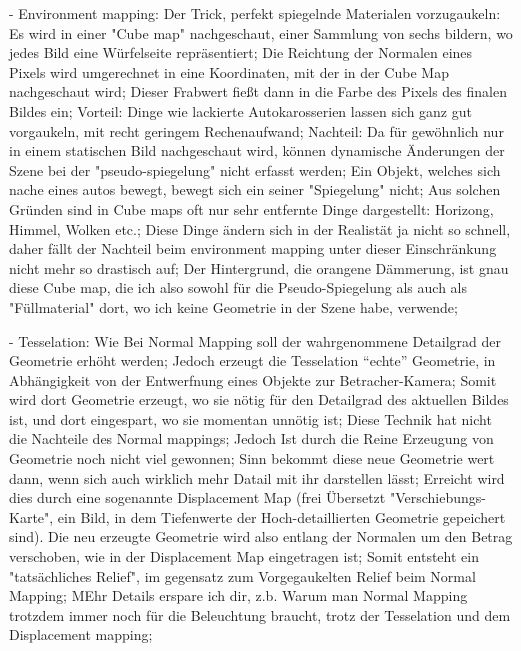 - Environment mapping: Der Trick, perfekt spiegelnde Materialen vorzugaukeln: Es wird in einer "Cube map" nachgeschaut, einer Sammlung von sechs bildern, wo jedes Bild eine Würfelseite repräsentiert; Die Reichtung der Normalen eines Pixels wird umgerechnet in eine Koordinaten, mit der in der Cube Map nachgeschaut wird; Dieser Frabwert fießt dann in die Farbe des Pixels des finalen Bildes ein; Vorteil: Dinge wie lackierte Autokarosserien lassen sich ganz gut vorgaukeln, mit recht geringem Rechenaufwand; Nachteil: Da für gewöhnlich nur in einem statischen Bild nachgeschaut wird, können dynamische Änderungen der Szene bei der "pseudo-spiegelung" nicht erfasst werden; Ein Objekt, welches sich nache eines autos bewegt, bewegt sich ein seiner "Spiegelung" nicht; Aus solchen Gründen sind in Cube maps oft nur sehr entfernte Dinge dargestellt: Horizong, Himmel, Wolken etc.; Diese Dinge ändern sich in der Realistät ja nicht so schnell, daher fällt der Nachteil beim environment mapping unter dieser Einschränkung nicht mehr so drastisch auf; Der Hintergrund, die orangene Dämmerung, ist gnau diese Cube map, die ich also sowohl für die Pseudo-Spiegelung als auch als "Füllmaterial" dort, wo ich keine Geometrie in der Szene habe, verwende;

- Tesselation: Wie Bei Normal Mapping soll der wahrgenommene Detailgrad der Geometrie erhöht werden; Jedoch erzeugt die Tesselation "`echte"' Geometrie, in Abhängigkeit von der Entwerfnung eines Objekte zur Betracher-Kamera; Somit wird dort Geometrie erzeugt, wo sie nötig für den Detailgrad des aktuellen Bildes ist, und dort eingespart, wo sie momentan unnötig ist; Diese Technik hat nicht die Nachteile des Normal mappings; Jedoch Ist durch die Reine Erzeugung von Geometrie noch nicht viel gewonnen; Sinn bekommt diese neue  Geometrie wert dann, wenn sich auch wirklich mehr Datail mit ihr darstellen lässt; Erreicht wird dies durch eine sogenannte Displacement Map (frei Übersetzt "Verschiebungs-Karte", ein Bild, in dem Tiefenwerte der Hoch-detaillierten Geometrie gepeichert sind). Die neu erzeugte Geometrie wird also entlang der Normalen um den Betrag verschoben, wie in der Displacement Map eingetragen ist; Somit entsteht ein "tatsächliches Relief", im gegensatz zum Vorgegaukelten Relief beim Normal Mapping; MEhr Details erspare ich dir, z.b. Warum man Normal Mapping trotzdem immer noch für die Beleuchtung braucht, trotz der Tesselation und dem Displacement mapping;

